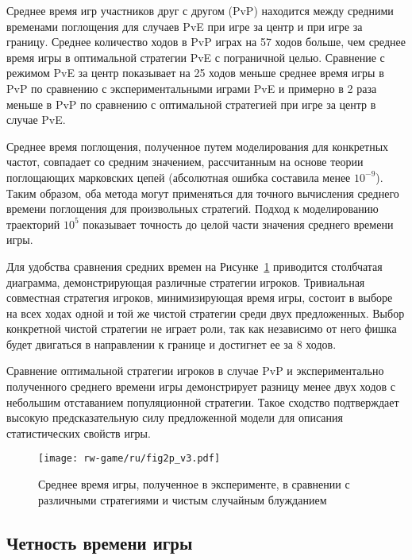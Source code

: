 Среднее время игр участников друг с другом (PvP) находится между средними временами поглощения для случаев PvE при игре за центр и при игре за границу. Среднее количество ходов в PvP играх на 57 ходов больше, чем среднее время игры в оптимальной стратегии PvE с пограничной целью. Сравнение с режимом PvE за центр показывает на 25 ходов меньше среднее время игры в PvP по сравнению с экспериментальными играми PvE и примерно в 2 раза меньше в PvP по сравнению с оптимальной стратегией при игре за центр в случае PvE.

Среднее время поглощения, полученное путем моделирования для конкретных частот, совпадает со средним значением, рассчитанным на основе теории поглощающих марковских цепей (абсолютная ошибка составила менее $10^{-9}$). Таким образом, оба метода могут применяться для точного вычисления среднего времени поглощения для произвольных стратегий. Подход к моделированию траекторий $10^5$ показывает точность до целой части значения среднего времени игры.

Для удобства сравнения средних времен на Рисунке~\cref{fig:mean-times} приводится столбчатая диаграмма, демонстрирующая различные стратегии игроков. Тривиальная совместная стратегия игроков, минимизирующая время игры, состоит в выборе на всех ходах одной и той же чистой стратегии среди двух предложенных. Выбор конкретной чистой стратегии не играет роли, так как независимо от него фишка будет двигаться в направлении к границе и достигнет ее за 8 ходов. 

Сравнение оптимальной стратегии игроков в случае PvP и экспериментально полученного среднего времени игры демонстрирует разницу менее двух ходов с небольшим отставанием популяционной стратегии. Такое сходство подтверждает высокую предсказательную силу предложенной модели для описания статистических свойств игры.

\begin{figure}[t]
    \centering
    \texttt{[image: rw-game/ru/fig2p\_v3.pdf]}
    \caption{
        Среднее время игры, полученное в эксперименте, в сравнении с различными стратегиями и чистым случайным блужданием
    }  
    \label{fig:mean-times}
\end{figure}


\subsection{Четность времени игры}\label{subsec:ch3/sec4/sub2}

